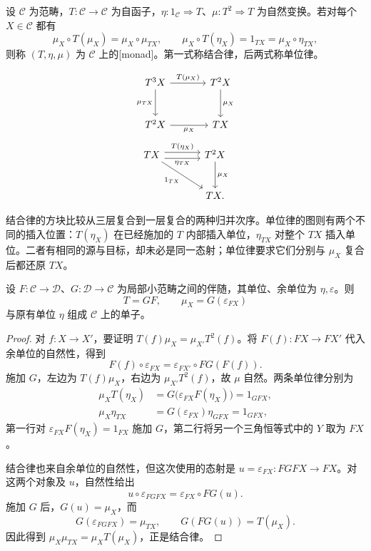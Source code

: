 \begin{definition}\label{b4:def:monad}
	设 \(\mathcal C\) 为范畴，\(T:\mathcal C\rightarrow\mathcal C\) 为自函子，\(\eta:1_{\mathcal C}\Rightarrow T\)、\(\mu:T^2\Rightarrow T\) 为自然变换。若对每个 \(X\in\mathcal C\) 都有
	\[
		\mu_X\circ T(\mu_X)=\mu_X\circ\mu_{TX}, \qquad \mu_X\circ T(\eta_X)=1_{TX}=\mu_X\circ\eta_{TX},
	\]
	则称 \((T,\eta,\mu)\) 为 \(\mathcal C\) 上的[monad]。第一式称结合律，后两式称单位律。
\end{definition}

\[
	\begin{tikzcd}[column sep=large,row sep=large]
		T^3X\arrow[r,"T(\mu_X)"]\arrow[d,"\mu_{TX}"']& T^2X\arrow[d,"\mu_X"]\\
		T^2X\arrow[r,"\mu_X"']&TX
	\end{tikzcd}
\]
\[
	\begin{tikzcd}[column sep=large,row sep=large]
		TX\arrow[r,shift left=0.7ex,"T(\eta_X)"] \arrow[r,shift right=0.7ex,"\eta_{TX}"'] \arrow[dr,"1_{TX}"']&T^2X\arrow[d,"\mu_X"]\\
		&TX.
	\end{tikzcd}
\]

结合律的方块比较从三层复合到一层复合的两种归并次序。单位律的图则有两个不同的插入位置：\(T(\eta_X)\) 在已经施加的 \(T\) 内部插入单位，\(\eta_{TX}\) 对整个 \(TX\) 插入单位。二者有相同的源与目标，却未必是同一态射；单位律要求它们分别与 \(\mu_X\) 复合后都还原 \(TX\)。

\begin{proposition}\label{b4:prop:adjunction-monad}
	设 \(F:\mathcal C\rightarrow\mathcal D\)、\(G:\mathcal D\rightarrow\mathcal C\) 为局部小范畴之间的伴随，其单位、余单位为 \(\eta,\varepsilon\)。则
	\[
		T=GF,\qquad \mu_X=G(\varepsilon_{FX})
	\]
	与原有单位 \(\eta\) 组成 \(\mathcal C\) 上的单子。
\end{proposition}
\begin{proof}
	对 \(f:X\rightarrow X'\)，要证明 \(T(f)\mu_X=\mu_{X'}T^2(f)\)。将 \(F(f):FX\rightarrow FX'\) 代入余单位的自然性，得到
	\[
		F(f)\circ\varepsilon_{FX} =\varepsilon_{FX'}\circ FG(F(f)).
	\]
	施加 \(G\)，左边为 \(T(f)\mu_X\)，右边为 \(\mu_{X'}T^2(f)\)，故 \(\mu\) 自然。两条单位律分别为
	\[
		\begin{aligned}
			\mu_XT(\eta_X) &=G\bigl(\varepsilon_{FX}F(\eta_X)\bigr)=1_{GFX},\\
			\mu_X\eta_{TX} &=G(\varepsilon_{FX})\eta_{GFX}=1_{GFX},
		\end{aligned}
	\]
	第一行对 \(\varepsilon_{FX}F(\eta_X)=1_{FX}\) 施加 \(G\)，第二行将另一个三角恒等式中的 \(Y\) 取为 \(FX\)。

	结合律也来自余单位的自然性，但这次使用的态射是 \(u=\varepsilon_{FX}:FGFX\rightarrow FX\)。对这两个对象及 \(u\)，自然性给出
	\[
		u\circ\varepsilon_{FGFX} =\varepsilon_{FX}\circ FG(u).
	\]
	施加 \(G\) 后，\(G(u)=\mu_X\)，而
	\[
		G(\varepsilon_{FGFX})=\mu_{TX},\qquad G(FG(u))=T(\mu_X).
	\]
	因此得到 \(\mu_X\mu_{TX}=\mu_XT(\mu_X)\)，正是结合律。
\end{proof}

